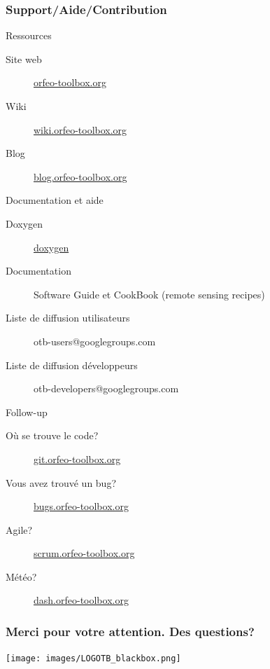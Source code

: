 \documentclass[8pt]{beamer}
\begin{document}
\begin{frame}
\frametitle{Support/Aide/Contribution}
\vspace{-0.2cm}
\begin{block}{Ressources}
\vspace{-0.2cm}
\begin{description}
\item[Site web] \href{http://www.orfeo-toolbox.org}{orfeo-toolbox.org}
\item[Wiki] \href{http://wiki.orfeo-toolbox.org}{wiki.orfeo-toolbox.org}
\item[Blog] \href{http://blog.orfeo-toolbox.org}{blog.orfeo-toolbox.org}
\end{description}
\end{block}
\vspace{-0.2cm}
\begin{block}{Documentation et aide}
\vspace{-0.2cm}
\begin{description}
\item[Doxygen] \href{http://www.orfeo-toolbox.org/doxygen/}{doxygen}
\item[Documentation] Software Guide et CookBook (remote sensing recipes)
\item[Liste de diffusion utilisateurs] otb-users@googlegroups.com
\item[Liste de diffusion développeurs] otb-developers@googlegroups.com
\end{description}
\end{block}
\vspace{-0.2cm}
\begin{block}{Follow-up}
\vspace{-0.2cm}
\begin{description}
\item[Où se trouve le code?] \href{http://git.orfeo-toolbox.org}{git.orfeo-toolbox.org}
\item[Vous avez trouvé un bug?] \href{http://bugs.orfeo-toolbox.org}{bugs.orfeo-toolbox.org}
\item[Agile?] \href{http://scrum.orfeo-toolbox.org}{scrum.orfeo-toolbox.org}
\item[Météo?] \href{http://dash.orfeo-toolbox.org}{dash.orfeo-toolbox.org}
\end{description}
\end{block}
\end{frame}

\begin{frame}
\frametitle{Merci pour votre attention. Des questions?}
\begin{minipage}[t][6cm][t]{\textwidth}
\begin{center}
\texttt{[image: images/LOGOTB\_blackbox.png]}
\end{center}
\end{minipage}
\end{frame}
\end{document}
